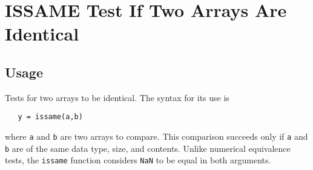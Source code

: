 \section{ISSAME Test If Two Arrays Are Identical}

\subsection{Usage}

Tests for two arrays to be identical.  The syntax
for its use is
\begin{verbatim}
   y = issame(a,b)
\end{verbatim}
where \verb|a| and \verb|b| are two arrays to compare.  This
comparison succeeds only if \verb|a| and \verb|b| are of the
same data type, size, and contents.  Unlike numerical
equivalence tests, the \verb|issame| function considers
\verb|NaN| to be equal in both arguments.
